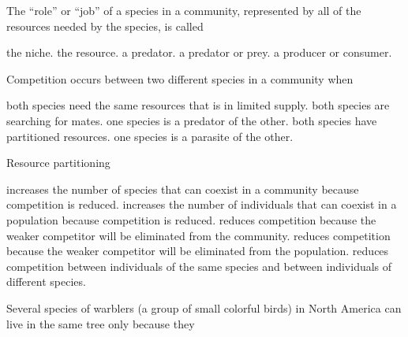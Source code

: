 
\question

\begin{choices}
\correctchoice   %
\choice  %
\choice  %
\choice  %
\choice  %
\end{choices}




\question
The ``role'' or ``job'' of a species in a community, represented by all of the resources needed by the species, is called 

\begin{choices}
	\correctchoice the niche.%
	\choice the resource.%
	\choice a predator.%
	\choice a predator or prey.%
	\choice a producer or consumer.%
\end{choices}


\question
Competition occurs between two different species in a community when

\begin{choices}
	\correctchoice both species need the same resources that is in limited supply.%
	\choice both species are searching for mates.%
	\choice one species is a predator of the other.%
	\choice both species have partitioned resources.%
	\choice one species is a parasite of the other.%
\end{choices}

\question
Resource partitioning

\begin{choices}
	\correctchoice increases the number of species that can coexist in a community because competition is reduced.%
	\choice increases the number of individuals that can coexist in a population because competition is reduced.%
	\choice reduces competition because the weaker competitor will be eliminated from the community.%
	\choice reduces competition because the weaker competitor will be eliminated from the population.%
	\choice reduces competition between individuals of the same species and between individuals of different species.%
\end{choices}

\question
Several species of warblers (a group of small colorful birds) in North America can live in the same tree only because they

